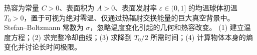 热容为常量 \(C>0\)、表面积为 \(A>0\)、表面发射率 \(\varepsilon\in(0,1]\) 的均温球体初温 \(T_0>0\)，置于可视为绝对零温、仅通过热辐射交换能量的巨大真空背景中。Stefan–Boltzmann 常数为 \(\sigma\)，忽略温度变化引起的几何和热容改变。
(1) 建立温度方程；(2) 求完整冷却曲线；(3) 求降到 \(T_0/2\) 所需时间；(4) 计算物体本身的熵变化并讨论长时间极限。
